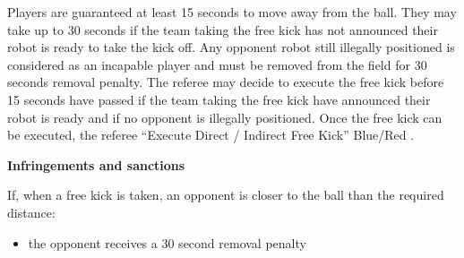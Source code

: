 Players are guaranteed at least 15 seconds to move away from the ball.
They may take up to 30 seconds if the team taking the free kick has not
announced their robot is ready to take the kick off.
Any opponent robot still illegally positioned is considered as an incapable
player and must be removed from the field for 30 seconds removal penalty.
The referee may decide to execute the free kick before 15 seconds have passed if
the team taking the free kick have announced their robot is ready and if no
opponent is illegally positioned.
Once the free kick can be executed, the referee   ``Execute Direct / Indirect Free Kick'' Blue/Red .

\bigskip

{\bfseries Infringements and sanctions}

\headlinebox

If, when a free kick is taken, an opponent is closer to the ball than the required distance:

\begin{itemize}
\item the opponent receives a 30 second removal penalty 
\end{itemize}


